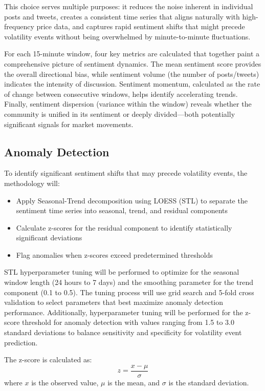 \documentclass[11pt,twocolumn]{article}
\begin{document}
This choice serves multiple purposes: it reduces the noise inherent in individual posts and tweets, creates a consistent time series that aligns naturally with high-frequency price data, and captures rapid sentiment shifts that might precede volatility events without being overwhelmed by minute-to-minute fluctuations.

For each 15-minute window, four key metrics are calculated that together paint a comprehensive picture of sentiment dynamics. The mean sentiment score provides the overall directional bias, while sentiment volume (the number of posts/tweets) indicates the intensity of discussion. Sentiment momentum, calculated as the rate of change between consecutive windows, helps identify accelerating trends. Finally, sentiment dispersion (variance within the window) reveals whether the community is unified in its sentiment or deeply divided—both potentially significant signals for market movements.

\subsection{\textbf{Anomaly Detection}}
To identify significant sentiment shifts that may precede volatility events, the methodology will:
\begin{itemize}
\item Apply Seasonal-Trend decomposition using LOESS (STL) to separate the sentiment time series into seasonal, trend, and residual components
\item Calculate z-scores for the residual component to identify statistically significant deviations
\item Flag anomalies when z-scores exceed predetermined thresholds
\end{itemize}

STL hyperparameter tuning will be performed to optimize for the seasonal window length (24 hours to 7 days) and the smoothing parameter for the trend component (0.1 to 0.5). The tuning process will use grid search and 5-fold cross validation to select parameters that best maximize anomaly detection performance. Additionally, hyperparameter tuning will be performed for the z-score threshold for anomaly detection with values ranging from 1.5 to 3.0 standard deviations to balance sensitivity and specificity for volatility event prediction.

The z-score is calculated as:
\begin{equation}
z = \frac{x - \mu}{\sigma}
\end{equation}
where $x$ is the observed value, $\mu$ is the mean, and $\sigma$ is the standard deviation.
\end{document}
